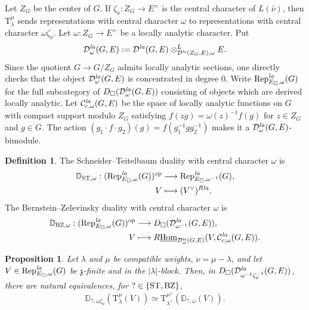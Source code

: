 \documentclass[a4paper,10pt]{amsart}
\theoremstyle{remark}
\theoremstyle{definition}
\newtheorem{definition}[theorem]{Definition}
\theoremstyle{plain}
\newtheorem{proposition}[theorem]{Proposition}
\numberwithin{equation}{section}
\newcommand{\bbD}{{\mathbb D}}
\newcommand{\frz}{{\mathfrak z}}
\newcommand{\calC}{{\mathcal C}}
\newcommand{\calD}{{\mathcal D}}
\newcommand{\Hom}{{\rm Hom}}
\newcommand{\uHom}{\underline{\Hom}}
\newcommand{\la}{{\it la}}
\newcommand{\Rep}{{\rm Rep}}
\newcommand{\ST}{{\rm ST}}
\newcommand{\BZ}{\ensuremath{\mathrm{BZ}}}
\begin{document}
Let $Z_G$ be the center of $G$.  If $\zeta_{\bar\nu}:Z_G\to E^\times$ is the central character of $L(\bar\nu)$, then $\mathrm T_\lambda^\mu$ sends representations with central character $\omega$ to representations with central character $\omega\zeta_{\bar\nu}$. Let $\omega:Z_G\to E^\times$ be a locally analytic character.  Put
\[
 \calD^{\la}_\omega(G,E):=
 \calD^{\la}(G,E)
 \otimes^L_{\calD^{\la}(Z_G,E),\omega}E.
\]
Since the quotient $G\to G/Z_G$ admits locally analytic sections, one directly checks that the object $\calD^{\la}_\omega(G,E)$ is concentrated in degree $0$. Write $\Rep^{\la}_{E_\square,\omega}(G)$ for the full subcategory of $D_{\square}(\calD^{\la}_\omega(G,E))$ consisting of objects which are derived locally analytic. Let $\calC_{c,\omega}^{\la}(G,E)$ be the space of locally analytic functions on $G$ with compact support modulo $Z_G$ satisfying $f(zg)=\omega(z)^{-1}f(g)$ for $z\in Z_G$ and $g\in G$. The action $(g_1\cdot f\cdot g_2)(g)=f(g_1^{-1}gg_2^{-1})$ makes it a $\calD^{\la}_\omega(G,E)$-bimodule.

\begin{definition}
The Schneider--Teitelbaum duality with central character $\omega$ is
\[
\begin{aligned}
 \bbD_{\ST,\omega}: (\Rep^{\la}_{E_\square,\omega}(G))^{\mathrm{op}} &\longrightarrow \Rep^{\la}_{E_\square,\omega^{-1}}(G),\\
 V&\longmapsto(V^\vee)^{R\la}.
\end{aligned}
\]
The Bernstein--Zelevinsky duality with central character $\omega$ is
\[
\begin{aligned}
 \bbD_{\BZ,\omega}:
 (\Rep^{\la}_{E_\square,\omega}(G))^{\mathrm{op}}
 &\longrightarrow
 D_{\square}(\calD^{\la}_{\omega^{-1}}(G,E)),\\
 V&\longmapsto
 R\uHom_{\calD^{\la}_\omega(G,E)}
 (V,\calC_{c,\omega}^{\la}(G,E)).
\end{aligned}
\]
\end{definition}


\begin{proposition}\label{prop:fixed-central-translation}
Let $\lambda$ and $\mu$ be compatible weights, $\nu=\mu-\lambda$, and let $V\in\Rep^{\la}_{E_\square,\omega}(G)$ be $\frz$-finite and in the $|\lambda|$-block. Then, in $D_{\square}(\calD^{\la}_{\omega^{-1}\zeta_{\bar\nu}^{-1}}(G,E))$, there are natural equivalences, for $?\in\{\ST,\BZ\}$,
\[
 \bbD_{?,\omega\zeta_{\bar\nu}}
 (\mathrm T_\lambda^\mu(V))\simeq
 \mathrm T_{\lambda^\vee}^{\mu^\vee}
 (\bbD_{?,\omega}(V)).
\]
\end{proposition}
\end{document}
